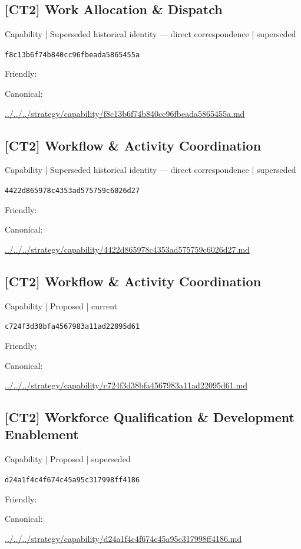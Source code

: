 \documentclass[10pt,a4paper]{article}
\begin{document}
\subsection*{[CT2] Work Allocation \& Dispatch}
{\small Capability | Superseded historical identity — direct correspondence | superseded}\par
\texttt{f8c13b6f74b840cc96fbeada5865455a}\par
Friendly: \par
Canonical: \par
{\footnotesize\url{../../../strategy/capability/f8c13b6f74b840cc96fbeada5865455a.md}}\par
\subsection*{[CT2] Workflow \& Activity Coordination}
{\small Capability | Superseded historical identity — direct correspondence | superseded}\par
\texttt{4422d865978c4353ad575759c6026d27}\par
Friendly: \par
Canonical: \par
{\footnotesize\url{../../../strategy/capability/4422d865978c4353ad575759c6026d27.md}}\par
\subsection*{[CT2] Workflow \& Activity Coordination}
{\small Capability | Proposed | current}\par
\texttt{c724f3d38bfa4567983a11ad22095d61}\par
Friendly: \par
Canonical: \par
{\footnotesize\url{../../../strategy/capability/c724f3d38bfa4567983a11ad22095d61.md}}\par
\subsection*{[CT2] Workforce Qualification \& Development Enablement}
{\small Capability | Proposed | superseded}\par
\texttt{d24a1f4c4f674c45a95c317998ff4186}\par
Friendly: \par
Canonical: \par
{\footnotesize\url{../../../strategy/capability/d24a1f4c4f674c45a95c317998ff4186.md}}\par
\end{document}
